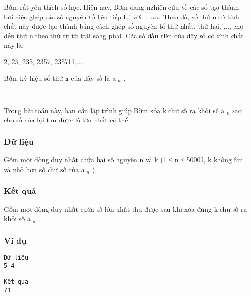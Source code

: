 

Bờm rất yêu thích số học. Hiện nay, Bờm đang nghiên cứu về các số tạo thành bởi việc ghép các số nguyên tố liên tiếp lại với nhau. Theo đố, số thứ n có tính chất này được tạo thành bằng cách ghép số nguyên tố thứ nhất, thứ hai, ..., cho đến thứ n theo thứ tự từ trái sang phải. Các số đầu tiên của dãy số có tính chất này là:

2, 23, 235, 2357, 235711,...

Bờm ký hiệu số thứ n của dãy số là a $_ n $ .

 

Trong bài toán này, bạn cần lập trình giúp Bờm xóa k chữ số ra khỏi số a $_ n $ sao cho số còn lại thu được là lớn nhất có thể.

\subsubsection{Dữ liệu}

Gồm một dòng duy nhất chứa hai số nguyên n và k (1 ≤ n ≤ 50000, k không âm và nhỏ hơn số chữ số của a $_ n $ ).

\subsubsection{Kết quả}

Gồm một dòng duy nhất chứa số lớn nhất thu được sau khi xóa đúng k chữ số ra khỏi số a $_ n $ .

\subsubsection{Ví dụ}
\begin{verbatim}
Dữ liệu
5 4

Kết qủa
71
\end{verbatim}